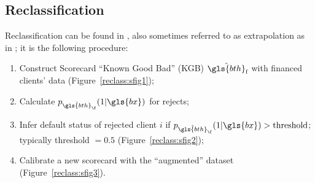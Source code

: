 \subsection{Reclassification} \label{reclassification}

Reclassification can be found in \cite{RI6}, also sometimes referred to as extrapolation as in \cite{banasik}; it is the following procedure:
\begin{enumerate}
\item Construct Scorecard ``Known Good Bad'' (KGB) $\hat{\gls{bth}}_{\text{f}}$ with financed clients' data (Figure~\ref{reclass:sfig1});
\item Calculate $p_{\hat{\gls{bth}}_{\f}}(1|\gls{bx})$ for rejects;
\item Infer default status of rejected client $i$ if $p_{\hat{\gls{bth}}_{\f}}(1|\gls{bx}) > \text{threshold}$; typically threshold $=0.5$ (Figure~\ref{reclass:sfig2});
\item Calibrate a new scorecard with the ``augmented'' dataset (Figure~\ref{reclass:sfig3}).
\end{enumerate}


